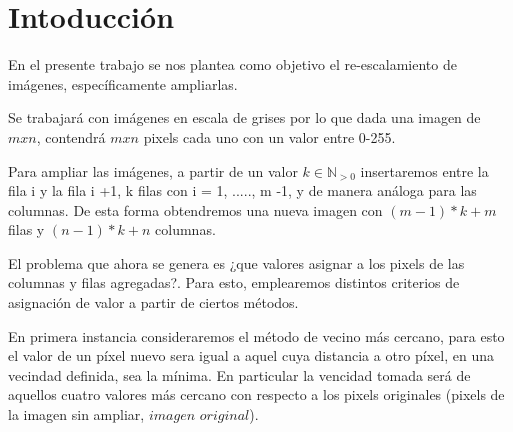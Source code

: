\documentclass[a4paper]{article}
\newcounter{col}
\begin{document}
\setcounter{page}{1}
\renewcommand{\tablename}{Tabla} 


\begin{abstract}

En este trabajo se utilizaran distintas técnicas para obtener un re-escalamiento de imágenes. Se utilizara vecino más cercano, interpolación de polinomios bilineal, splines cúbicos, y distintas variantes de los métodos anteriormente mencionados. Se implementaran algoritmos para los mismos, dando la posibilidad de re-escalar las imágenes en distintos tamaños(siempre mayor al original). Se llevara a cabo una experimentación con su respectivo análisis. Como las imágenes obtenidas, no contienen integramente información original, se utilizaran las métricas de Error Cuadrático Medio (ECM) y Peak to Signal Noise Ratio (PSNR) para estudiar en forma cuantitativa la calidad de las mismas. También se considerara la calidad subjetiva, y el tiempo de computo. 

\textbf{Palabras Clave}: re-escalamiento imágenes, interpolación, ECM, PSNR

\end{abstract}

\newpage

\section{Intoducción}

En el presente trabajo se nos plantea como objetivo el re-escalamiento de imágenes, específicamente ampliarlas.

Se trabajar\'a con imágenes en escala de grises por lo que dada una imagen de $mxn$, contendrá $mxn$ pixels cada uno con un valor entre 0-255.

Para ampliar las imágenes, a partir de un valor $k \in \mathbb{N}_{>0}$ insertaremos entre la fila i y la fila i +1, k filas con i = 1, ....., m -1, y de manera análoga para las columnas. De esta forma obtendremos una nueva imagen con $(m -1)*k + m$ filas y $(n -1)*k + n$ columnas.

El problema que ahora se genera es ¿que valores asignar a los pixels de las columnas y filas agregadas?. Para esto, emplearemos distintos criterios de asignación de valor a partir de ciertos métodos.

En primera instancia consideraremos el método de vecino m\'as cercano, para esto el valor de un píxel nuevo sera igual a aquel cuya distancia a otro píxel, en una vecindad definida, sea la mínima. En particular la vencidad tomada será de aquellos cuatro valores más cercano con respecto a los pixels originales (pixels de la imagen sin ampliar, $imagen$ $original$). 
\end{document}
